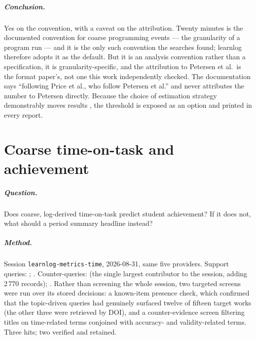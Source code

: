 \paragraph{Conclusion.}
Yes on the convention, with a caveat on the attribution.  Twenty minutes is
the documented convention for coarse programming events --- the granularity
of a program run --- and it is the only such convention the searches found;
learnlog therefore adopts it as the default.  But it is an analysis
convention rather than a specification, it is granularity-specific, and the
attribution to Petersen et al.\ is the format paper's, not one this work
independently checked.  The documentation says \enquote{following Price et
al., who follow Petersen et al.} and never attributes the number to Petersen
directly.  Because the choice of estimation strategy demonstrably moves
results \autocite{kovanovic2015penetrating}, the threshold is exposed as an
option and printed in every report.

\chapter{Coarse time-on-task and achievement}
\label{app:claim:time-not-predictive}

\paragraph{Question.}
Does coarse, log-derived time-on-task predict student achievement?  If it
does not, what should a period summary headline instead?

\paragraph{Method.}
Session \texttt{learnlog-metrics-time}, 2026-08-31, same five providers.
Support queries: ; .  Counter-queries:
 (the single largest
contributor to the session, adding 2\,770 records); .  Rather than screening the whole session,
two targeted screens were run over its stored decisions: a known-item
presence check, which confirmed that the topic-driven queries had genuinely
surfaced twelve of fifteen target works (the other three were retrieved by
DOI), and a counter-evidence screen filtering titles on time-related terms
conjoined with accuracy- and validity-related terms.  Three hits; two
verified and retained.

